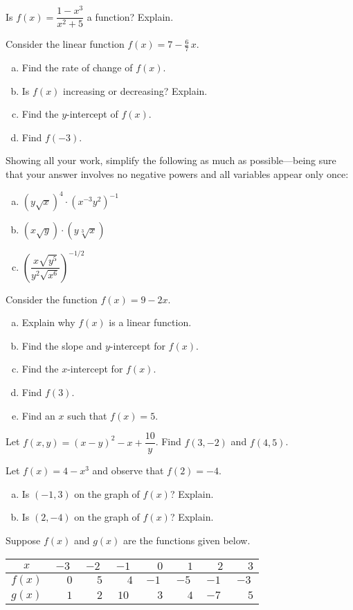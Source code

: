 \documentclass[11pt,letterpaper]{article}
\begin{document}
\prob Is $f(x)= \dfrac{1 - x^3}{x^2 + 5}$ a function? Explain. \pspace


\prob Consider the linear function $f(x)= 7 - \frac{6}{7}\, x$.
	\begin{enumerate}[(a)]
	\item Find the rate of change of $f(x)$.
	\item Is $f(x)$ increasing or decreasing? Explain.
	\item Find the $y$-intercept of $f(x)$.
	\item Find $f(-3)$.
	\end{enumerate} \pspace


\prob Showing all your work, simplify the following as much as possible---being sure that your answer involves no negative powers and all variables appear only once:
	\begin{enumerate}[(a)]
	\item $(y \sqrt{x})^4 \cdot (x^{-3} y^2)^{-1}$
	\item $(x \sqrt{y}) \cdot (y \sqrt[3]{x})$
	\item $\left( \dfrac{x \sqrt{y^5}}{y^2 \sqrt{x^6}} \right)^{-1/2}$
	\end{enumerate} \pspace


\prob Consider the function $f(x)= 9 - 2x$. 
	\begin{enumerate}[(a)]
	\item Explain why $f(x)$ is a linear function. 
	\item Find the slope and $y$-intercept for $f(x)$. 
	\item Find the $x$-intercept for $f(x)$. 
	\item Find $f(3)$. 
	\item Find an $x$ such that $f(x)= 5$. 
	\end{enumerate} \pspace


\prob Let $f(x, y)= (x - y)^2 - x + \dfrac{10}{y}$. Find $f(3, -2)$ and $f(4, 5)$. \pspace


\prob Let $f(x)= 4 - x^3$ and observe that $f(2)= -4$. 
	\begin{enumerate}[(a)]
	\item Is $(-1, 3)$ on the graph of $f(x)$? Explain. 
	\item Is $(2, -4)$ on the graph of $f(x)$? Explain. 
	\end{enumerate} \pspace


\prob Suppose $f(x)$ and $g(x)$ are the functions given below. 
        \begin{table}[H]
        \centering
        \begin{tabular}{| c || c | c | c | c | c | c | c |} \hline
	$x$ & $-3$ & $-2$ & $-1$ & $\phantom{-}0$ & $\phantom{-}1$ & $\phantom{-}2$ & $\phantom{-}3$ \\ \hline
	$f(x)$ & $\phantom{-}0$ & $\phantom{-}5$ & $\phantom{-}4$ & $-1$ & $-5$ & $-1$ & $-3$ \\ \hline
	$g(x)$ & $\phantom{-}1$ & $\phantom{-}2$ & $10$ & $\phantom{-}3$ & $\phantom{-}4$ & $-7$ & $\phantom{-}5$  \\ \hline
        \end{tabular}
        \end{table}
\end{document}
